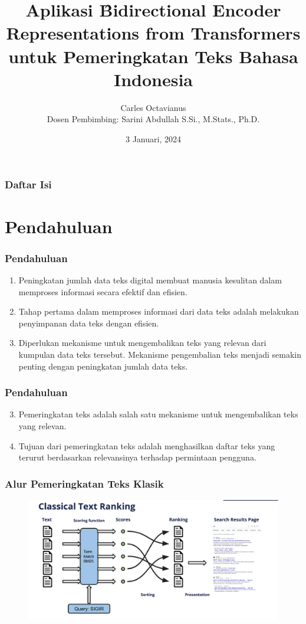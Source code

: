 \documentclass[10pt]{beamer}
\title{Aplikasi \f{Bidirectional Encoder Representations from Transformers} untuk Pemeringkatan Teks Bahasa Indonesia}
\author{Carles Octavianus \\ Dosen Pembimbing: Sarini Abdullah S.Si., M.Stats., Ph.D.}
\date{3 Januari, 2024}
\begin{document}
\frame{\titlepage}




\begin{frame}
    \frametitle{Daftar Isi}
    \tableofcontents
\end{frame}


\section{Pendahuluan}
\begin{frame}
    \frametitle{Pendahuluan}

\begin{enumerate}
    \item Peningkatan jumlah data teks digital membuat manusia kesulitan dalam memproses informasi secara efektif dan efisien.
    \item Tahap pertama dalam memproses informasi dari data teks adalah melakukan penyimpanan data teks dengan efisien.
    \item Diperlukan mekanisme untuk mengembalikan teks yang relevan dari kumpulan data teks tersebut. Mekanisme pengembalian teks menjadi semakin penting dengan peningkatan jumlah data teks.
\end{enumerate}
\end{frame}

\begin{frame}
    \frametitle{Pendahuluan}
    \begin{enumerate}
        \setcounter{enumi}{2}
        \item Pemeringkatan teks adalah salah satu mekanisme untuk mengembalikan teks yang relevan.
        \item Tujuan dari pemeringkatan teks adalah menghasilkan daftar teks yang terurut berdasarkan relevansinya terhadap permintaan pengguna.
    \end{enumerate}
\end{frame}

\frametitle{Alur Pemeringkatan Teks Klasik}
\begin{frame}
    \begin{figure}
        \centering
        \includegraphics[width=1\textwidth]{assets/pics/classical-IR.png}
    \end{figure}
\end{frame}
\end{document}
